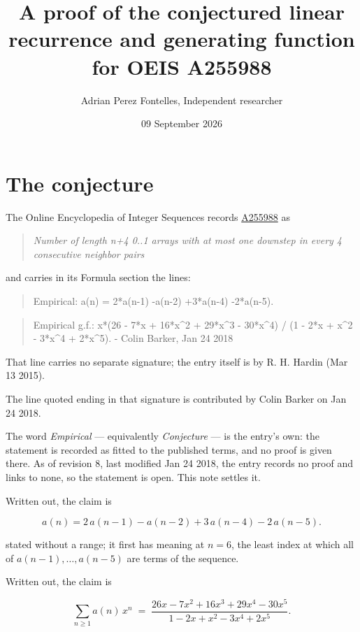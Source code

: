 \documentclass[11pt]{article}
\title{A proof of the conjectured linear recurrence and generating function for OEIS A255988}
\author{Adrian Perez Fontelles, Independent researcher}
\date{09 September 2026}
\theoremstyle{definition}
\begin{document}
\maketitle
\section{The conjecture}

The Online Encyclopedia of Integer Sequences records \href{https://oeis.org/A255988}{A255988} as

\begin{quote}\itshape Number of length n+4 0..1 arrays with at most one downstep in every 4 consecutive neighbor pairs\end{quote}

and carries in its Formula section the lines:

\begin{quote}\ttfamily Empirical: a(n) = 2*a(n-1) -a(n-2) +3*a(n-4) -2*a(n-5).\end{quote}

\begin{quote}\ttfamily Empirical g.f.: x*(26 - 7*x + 16*x\textasciicircum{}2 + 29*x\textasciicircum{}3 - 30*x\textasciicircum{}4) / (1 - 2*x + x\textasciicircum{}2 - 3*x\textasciicircum{}4 + 2*x\textasciicircum{}5). - Colin Barker, Jan 24 2018\end{quote}

That line carries no separate signature; the entry itself is by R. H. Hardin (Mar 13 2015).

The line quoted ending in that signature is contributed by Colin Barker on Jan 24 2018.

The word {\itshape Empirical} --- equivalently {\itshape Conjecture} --- is the entry's own: the statement is recorded as fitted to the published terms, and no proof is given there. As of revision 8, last modified Jan 24 2018, the entry records no proof and links to none, so the statement is open. This note settles it.

Written out, the claim is

\[a(n) = 2\,a(n-1) - a(n-2) + 3\,a(n-4) - 2\,a(n-5).\]

stated without a range; it first has meaning at $n = 6$, the least index at which all of $a(n-1),\dots,a(n-5)$ are terms of the sequence.

Written out, the claim is

\[\sum_{n \ge 1} a(n)\,x^n \;=\; \frac{26x - 7x^{2} + 16x^{3} + 29x^{4} - 30x^{5}}{1 - 2x + x^{2} - 3x^{4} + 2x^{5}}.\]
\end{document}
